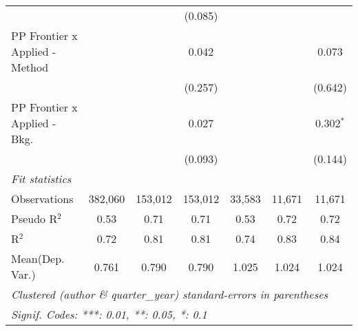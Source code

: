 \begin{tabular}{lcccccc}
                                  &                &               & (0.085)        &               &              &   \\   
   PP Frontier x Applied - Method &                &               & 0.042          &               &              & 0.073\\   
                                  &                &               & (0.257)        &               &              & (0.642)\\   
   PP Frontier x Applied - Bkg.   &                &               & 0.027          &               &              & 0.302$^{*}$\\   
                                  &                &               & (0.093)        &               &              & (0.144)\\   
   \midrule
   \emph{Fit statistics}\\
   Observations                   & 382,060        & 153,012       & 153,012        & 33,583        & 11,671       & 11,671\\  
   Pseudo R$^2$                   & 0.53           & 0.71          & 0.71           & 0.53          & 0.72         & 0.72\\  
   R$^2$                          & 0.72           & 0.81          & 0.81           & 0.74          & 0.83         & 0.84\\  
Mean(Dep. Var.) & 0.761 & 0.790 & 0.790 & 1.025 & 1.024 & 1.024 \\
   \midrule \midrule
   \multicolumn{7}{l}{\emph{Clustered (author \& quarter\_year) standard-errors in parentheses}}\\
   \multicolumn{7}{l}{\emph{Signif. Codes: ***: 0.01, **: 0.05, *: 0.1}}\\
\end{tabular}
\par\endgroup
